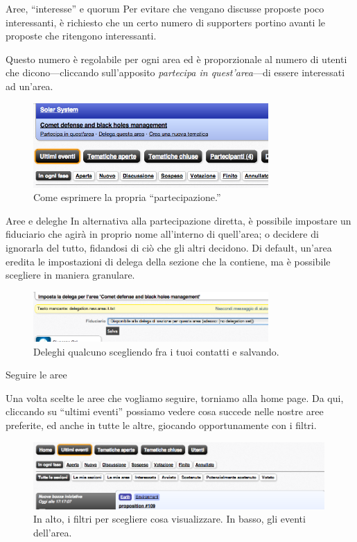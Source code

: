 \documentclass{beamer}
\begin{document}
\begin{frame}{Aree, ``interesse'' e quorum}
Per evitare che vengano discusse proposte poco interessanti, \`e richiesto che un certo numero di supporters portino avanti le proposte che ritengono interessanti.

Questo numero \`e regolabile per ogni area ed \`e proporzionale al numero di utenti che dicono---cliccando sull'apposito \emph{partecipa in quest'area}---di essere interessati ad un'area.
\begin{figure}\includegraphics[width=0.8\textwidth]{pics/partecipa}
\caption{Come esprimere la propria ``partecipazione.''}
\end{figure}
\end{frame}

\begin{frame}{Aree e deleghe}
In alternativa alla partecipazione diretta, \`e possibile impostare un fiduciario che agir\`a in proprio nome all'interno di quell'area; o decidere di ignorarla del tutto, fidandosi di ci\`o che gli altri decidono. Di default, un'area eredita le impostazioni di delega della sezione che la contiene, ma \`e possibile scegliere in maniera granulare.
\begin{figure}\includegraphics[width=0.8\textwidth]{pics/delega}
\caption{Deleghi qualcuno scegliendo fra i tuoi contatti e salvando.}
\end{figure}
\end{frame}

\begin{frame}{Seguire le aree}

Una volta scelte le aree che vogliamo seguire, torniamo alla home page. Da qui, cliccando su ``ultimi eventi'' possiamo vedere cosa succede nelle nostre aree preferite, ed anche in tutte le altre, giocando opportunamente con i filtri.
\begin{figure}
\includegraphics[width=0.99\textwidth]{pics/timeline-filters}
\caption{In alto, i filtri per scegliere cosa visualizzare. In basso, gli eventi dell'area.}
\end{figure}
\end{frame}
\end{document}
